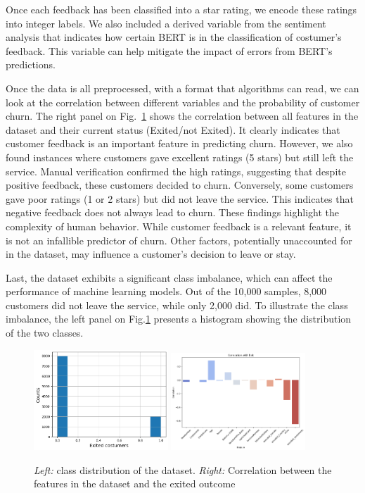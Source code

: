 \documentclass[12pt]{article}
\begin{document}
Once each feedback has been classified into a star rating, we encode these ratings into integer labels. We also included a derived variable from the sentiment analysis that indicates how certain BERT is in the classification of costumer's feedback. This variable can help mitigate the impact of errors from BERT's predictions.

Once the data is all preprocessed, with a format that algorithms can read, we can look at the correlation between different variables and the probability of customer churn. The right panel on Fig.~\ref{fig:class_distribution} shows the correlation between all features in the dataset and their current status (Exited/not Exited). It clearly indicates that customer feedback is an important feature in predicting churn. However, we also found instances where customers gave excellent ratings (5 stars) but still left the service. Manual verification confirmed the high ratings, suggesting that despite positive feedback, these customers decided to churn. Conversely, some customers gave poor ratings (1 or 2 stars) but did not leave the service. This indicates that negative feedback does not always lead to churn. These findings highlight the complexity of human behavior. While customer feedback is a relevant feature, it is not an infallible predictor of churn. Other factors, potentially unaccounted for in the dataset, may influence a customer's decision to leave or stay. 

Last, the dataset exhibits a significant class imbalance, which can affect the performance of machine learning models. Out of the 10,000 samples, 8,000 customers did not leave the service, while only 2,000 did. To illustrate the class imbalance, the left panel on Fig.\ref{fig:class_distribution} presents a histogram showing the distribution of the two classes.


\begin{figure}[h!]
    \centering
    \includegraphics[width=0.45\textwidth]{figures/class_distribution.png}
    \includegraphics[width=0.45\textwidth]{figures/correlation_matrix.png}
    \caption{\emph{Left:} class distribution of the dataset. \emph{Right:} Correlation between the features in the dataset and the exited outcome}
    \label{fig:class_distribution}
\end{figure}
\end{document}
